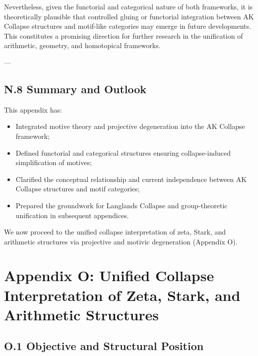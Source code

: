 \documentclass[11pt]{article}
\begin{document}
Nevertheless, given the functorial and categorical nature of both frameworks, it is theoretically plausible that controlled gluing or functorial integration between AK Collapse structures and motif-like categories may emerge in future developments. This constitutes a promising direction for further research in the unification of arithmetic, geometry, and homotopical frameworks.

---

\subsection*{N.8 Summary and Outlook}

This appendix has:
\begin{itemize}
  \item Integrated motive theory and projective degeneration into the AK Collapse framework;
  \item Defined functorial and categorical structures ensuring collapse-induced simplification of motives;
  \item Clarified the conceptual relationship and current independence between AK Collapse structures and motif categories;
  \item Prepared the groundwork for Langlands Collapse and group-theoretic unification in subsequent appendices.
\end{itemize}

We now proceed to the unified collapse interpretation of zeta, Stark, and arithmetic structures via projective and motivic degeneration (Appendix O).




\section*{Appendix O: Unified Collapse Interpretation of Zeta, Stark, and Arithmetic Structures}

\subsection*{O.1 Objective and Structural Position}
\end{document}
